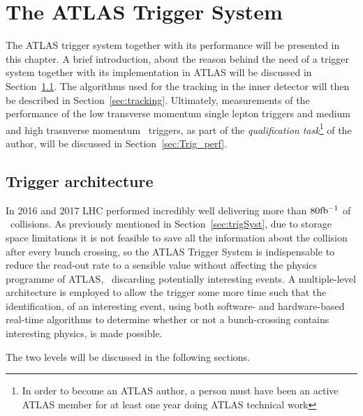 \chapter{The ATLAS Trigger System}
\label{ch:trigger}

	The ATLAS trigger system together with its performance will be presented in this chapter. A brief introduction, about the reason behind the need of a trigger system together with its implementation in ATLAS will be discussed in Section~\ref{sec:Trig_intro}. The algorithms used for the tracking in the inner detector will then be described in Section~\ref{sec:tracking}. Ultimately, measurements of the performance of the low transverse momentum single lepton triggers and medium and high trasnverse momentum \bj\ triggers, as part of the \textit{qualification task}\footnote{In order to become an ATLAS author, a person must have been an active ATLAS member for at least one year doing ATLAS technical work} of the author, will be discussed in Section~\ref{sec:Trig_perf}. 



	\section{Trigger architecture}
	\label{sec:Trig_intro}

		In 2016 and 2017 LHC performed incredibly well delivering more than $80 \mbox{fb$^{-1}$}$ of \pp\ collisions. As previously mentioned in Section~\ref{sec:trigSyst}, due to storage space limitations it is not feasible to save all the information about the collision after every bunch crossing, so the ATLAS Trigger System is indispensable to reduce the read-out rate to a sensible value without affecting the physics programme of ATLAS, \eg\ discarding potentially interesting events. A multiple-level architecture is employed to allow the trigger some more time such that the identification, of an interesting event, using both software- and hardware-based real-time algorithms to determine whether or not a bunch-crossing contains interesting physics, is made possible. 

		The two levels will be discussed in the following sections.
		

